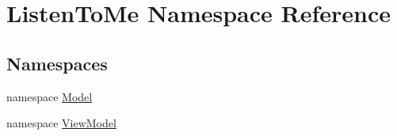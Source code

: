 \hypertarget{namespace_listen_to_me}{}\section{Listen\+To\+Me Namespace Reference}
\label{namespace_listen_to_me}
\subsection*{Namespaces}
\begin{DoxyCompactItemize}
\item 
namespace \mbox{\hyperlink{namespace_listen_to_me_1_1_model}{Model}}
\item 
namespace \mbox{\hyperlink{namespace_listen_to_me_1_1_view_model}{View\+Model}}
\end{DoxyCompactItemize}
